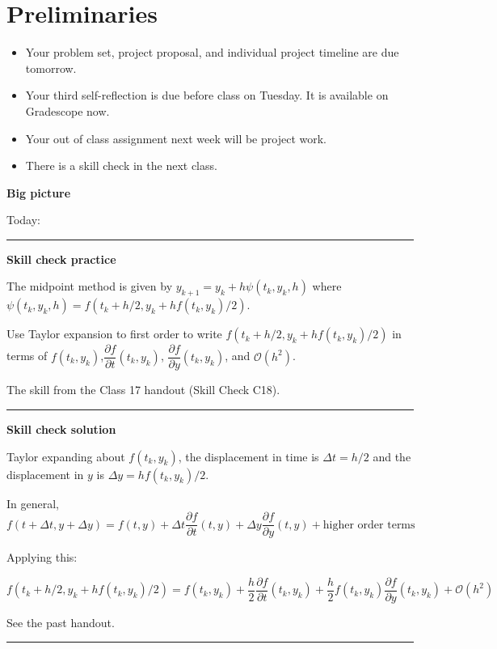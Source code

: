 \documentclass[12pt,letterpaper,noanswers]{exam}
\begin{document}
 \pdfpageheight 11in 
  \pdfpagewidth 8.5in

\noindent 

\section*{Preliminaries}

\begin{itemize}
\itemsep0pt
\item Your problem set, project proposal, and individual project timeline are due tomorrow.
\item Your third self-reflection is due before class on Tuesday.  It is available on Gradescope now.
\item Your out of class assignment next week will be project work.
\item There is a skill check in the next class.
\end{itemize}


\noindent\textbf{Big picture}

Today: 

\vspace{0.2cm}
\hrule
\vspace{0.2cm}

\noindent \textbf{Skill check practice}
\begin{questions}
\item The midpoint method is given by $y_{k+1} = y_k + h\psi(t_k,y_k,h)$ where $\psi(t_k,y_k,h) = f(t_k+h/2,y_k+hf(t_k,y_k)/2)$.

Use Taylor expansion to first order to write $f(t_k+h/2,y_k+hf(t_k,y_k)/2)$ in terms of $f(t_k, y_k)$,$\dfrac{\partial f}{\partial t}(t_k,y_k)$, $\dfrac{\partial f}{\partial y}(t_k,y_k)$, and $\mathcal{O}(h^2)$.

\item The skill from the Class 17 handout (Skill Check C18).
\end{questions}


\vspace{0.2cm}
\hrule
\vspace{0.2cm}

\noindent \textbf{Skill check solution}
\begin{questions}
\item

Taylor expanding about $f(t_k, y_k)$, the displacement in time is $\Delta t = h/2$ and the displacement in $y$ is $\Delta y = hf(t_k,y_k)/2$.

In general, $f(t+\Delta t, y+\Delta y) = f(t,y) + \Delta t \dfrac{\partial f}{\partial t}(t,y) +  \Delta y \dfrac{\partial f}{\partial y}(t,y) + \text{higher order terms}$


Applying this:

$f(t_k+h/2,y_k+hf(t_k,y_k)/2) = f(t_k,y_k) + \dfrac{h}{2} \dfrac{\partial f}{\partial t}(t_k,y_k) + \dfrac{h}{2}f(t_k,y_k) \dfrac{\partial f}{\partial y}(t_k,y_k) + \mathcal{O}(h^2)$

\item See the past handout.
\end{questions}
\vspace{0.2cm}
\hrule
\vspace{0.2cm}
\end{document}
